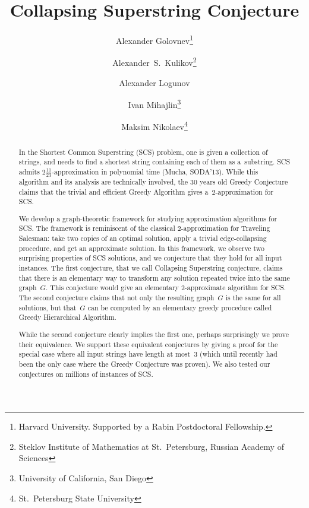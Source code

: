 \documentclass[11pt]{article}
\begin{document}
\sloppy
\begin{titlepage}
\title{Collapsing Superstring Conjecture}
\author{
Alexander Golovnev\thanks{Harvard University. Supported by a Rabin Postdoctoral Fellowship.}
\and
Alexander~S.~Kulikov\thanks{Steklov Institute of Mathematics at St.~Petersburg, Russian Academy of Sciences}
\and
Alexander Logunov\footnotemark[2]
\and
Ivan Mihajlin\thanks{University of California, San Diego}
\and 
Maksim Nikolaev\thanks{St.~Petersburg State University}
}
\maketitle
\thispagestyle{empty}

\begin{abstract}
In the Shortest Common Superstring (SCS) problem, one is given a collection of strings, and needs to find a shortest string containing each of them as a~substring. SCS admits $2\frac{11}{23}$-approximation in polynomial time (Mucha, SODA'13). While this algorithm and its analysis are technically involved, the $30$ years old Greedy Conjecture claims that the trivial and efficient Greedy Algorithm gives a~$2$-approximation for SCS. %

We develop a graph-theoretic framework for studying approximation algorithms for SCS. The framework is reminiscent of the classical 2-approximation for Traveling Salesman: take two copies of an optimal solution, apply a trivial edge-collapsing procedure, and get an approximate solution. In this framework, we observe two surprising properties of SCS solutions, and we conjecture that they hold for all input instances. 
The first conjecture, that we call Collapsing Superstring conjecture, claims that there is an elementary way to transform any solution repeated twice into the same graph~$G$. This conjecture would give an elementary 2-approximate algorithm for SCS. The second conjecture claims that not only the resulting graph~$G$ is the same for all solutions, but that~$G$ can be computed by an elementary greedy procedure called Greedy Hierarchical Algorithm.

While the second conjecture clearly implies the first one, perhaps surprisingly we prove their equivalence. We support these equivalent conjectures by giving a proof for the special case where all input strings have length at most~$3$ (which until recently had been the only case where the Greedy Conjecture was proven). We also tested our conjectures on millions of instances of SCS.


\end{abstract}
\end{titlepage}
\end{document}

